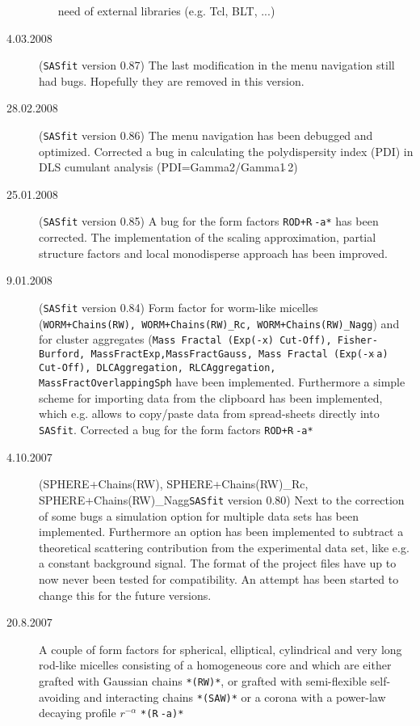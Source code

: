 \begin{description}
\begin{enumerate}
                need of external libraries (e.g. Tcl, BLT, ...)
    \end{enumerate}
    \item[4.03.2008] ({\tt SASfit} version 0.87) The last
    modification in the menu navigation still had bugs. Hopefully
    they are removed in this version.
    \item[28.02.2008] ({\tt SASfit} version 0.86)
    The menu navigation has been debugged and optimized.
    Corrected a bug in calculating the polydispersity index (PDI)
    in DLS cumulant analysis (PDI=Gamma2/Gamma1$\hat{~}$2)
    \item[25.01.2008] ({\tt SASfit} version 0.85)
    A bug for the form factors  \texttt{ROD+R$\hat{~}$-a*} has
    been corrected. The implementation of the scaling
    approximation, partial structure factors and local monodisperse
    approach has been improved.
    \item[9.01.2008] ({\tt SASfit} version 0.84) Form factor for
    worm-like micelles (\texttt{WORM+Chains(RW), WORM+Chains(RW)\_Rc,
    WORM+Chains(RW)\_Nagg}) and for cluster aggregates
    (\texttt{Mass Fractal (Exp(-x) Cut-Off), Fisher-Burford,
    MassFractExp,MassFractGauss, Mass Fractal (Exp(-x$\hat{~}$a) Cut-Off), DLCAggregation,
    RLCAggregation, MassFractOverlappingSph} have been implemented. Furthermore a simple scheme for importing data
    from the clipboard has been implemented, which e.g. allows to copy/paste
    data from spread-sheets directly into {\tt SASfit}.
    Corrected a bug for the form factors  \texttt{ROD+R$\hat{~}$-a*}
    \item[4.10.2007] ({SPHERE+Chains(RW), SPHERE+Chains(RW)\_Rc, SPHERE+Chains(RW)\_Nagg\tt SASfit} version 0.80)
    Next to the correction of some bugs a simulation option for
    multiple data sets has been implemented. Furthermore an option has been implemented to subtract a
    theoretical scattering contribution from the experimental data set, like e.g. a constant background signal.
    The format of the project files have up to now never been tested for compatibility. An attempt has
    been started to change this for the future versions.
    \item[20.8.2007] A couple of form factors for spherical, elliptical, cylindrical and very long rod-like
    micelles consisting of a homogeneous core and which are either grafted with Gaussian chains \texttt{*(RW)*},
    or grafted with semi-flexible self-avoiding and interacting chains \texttt{*(SAW)*} or
    a corona with a power-law decaying profile $r^{-\alpha}$ \texttt{*(R$\hat{~}$-a)*}

\end{description}
